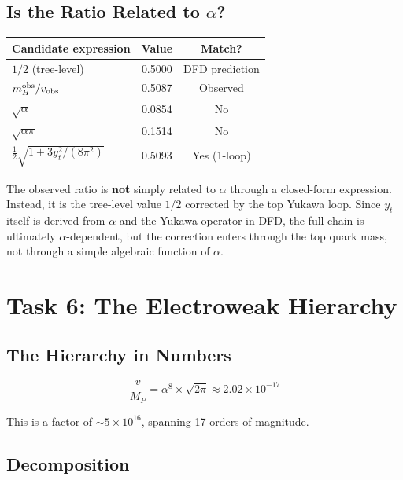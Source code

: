 \documentclass[11pt]{article}
\theoremstyle{definition}
\begin{document}
\subsection{Is the Ratio Related to $\alpha$?}

\begin{center}
\renewcommand{\arraystretch}{1.3}
\begin{tabular}{lcc}
\toprule
Candidate expression & Value & Match? \\
\midrule
$1/2$ (tree-level) & 0.5000 & DFD prediction \\
$m_H^{\rm obs}/v_{\rm obs}$ & 0.5087 & Observed \\
$\sqrt{\alpha}$ & 0.0854 & No \\
$\sqrt{\alpha \pi}$ & 0.1514 & No \\
$\frac{1}{2}\sqrt{1 + 3y_t^2/(8\pi^2)}$ & 0.5093 & Yes (1-loop) \\
\bottomrule
\end{tabular}
\end{center}

The observed ratio is \textbf{not} simply related to $\alpha$ through
a closed-form expression. Instead, it is the tree-level value $1/2$
corrected by the top Yukawa loop. Since $y_t$ itself is derived from
$\alpha$ and the Yukawa operator in DFD, the full chain is ultimately
$\alpha$-dependent, but the correction enters through the top quark
mass, not through a simple algebraic function of $\alpha$.

\section{Task 6: The Electroweak Hierarchy}
\label{sec:hierarchy}

\subsection{The Hierarchy in Numbers}

\begin{equation}\label{eq:hierarchy}
\boxed{\frac{v}{M_P} = \alpha^8 \times \sqrt{2\pi}
\approx 2.02 \times 10^{-17}}
\end{equation}

This is a factor of $\sim 5 \times 10^{16}$, spanning 17 orders of
magnitude.

\subsection{Decomposition}
\end{document}
